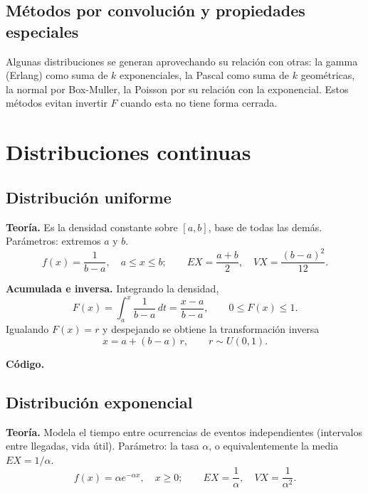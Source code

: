 \documentclass[11pt]{article}
\begin{document}
\subsection{M\'etodos por convoluci\'on y propiedades especiales}

Algunas distribuciones se generan aprovechando su relaci\'on con otras: la
gamma (Erlang) como suma de $k$ exponenciales, la Pascal como suma de $k$
geom\'etricas, la normal por Box-Muller, la Poisson por su relaci\'on con
la exponencial. Estos m\'etodos evitan invertir $F$ cuando esta no tiene
forma cerrada.

\section{Distribuciones continuas}

\subsection{Distribuci\'on uniforme}

\textbf{Teor\'ia.} Es la densidad constante sobre $[a,b]$, base de todas las
dem\'as. Par\'ametros: extremos $a$ y $b$.
\begin{equation}
f(x) = \frac{1}{b-a}, \quad a \le x \le b; \qquad
EX = \frac{a+b}{2}, \quad VX = \frac{(b-a)^2}{12}.
\end{equation}

\textbf{Acumulada e inversa.} Integrando la densidad,
\begin{equation}
F(x) = \int_a^x \frac{1}{b-a}\,dt = \frac{x-a}{b-a},
\qquad 0 \le F(x) \le 1.
\end{equation}
Igualando $F(x) = r$ y despejando se obtiene la transformaci\'on inversa
\begin{equation}
x = a + (b-a)\,r, \qquad r \sim U(0,1).
\end{equation}

\textbf{C\'odigo.}


\subsection{Distribuci\'on exponencial}

\textbf{Teor\'ia.} Modela el tiempo entre ocurrencias de eventos
independientes (intervalos entre llegadas, vida \'util). Par\'ametro: la
tasa $\alpha$, o equivalentemente la media $EX = 1/\alpha$.
\begin{equation}
f(x) = \alpha e^{-\alpha x}, \quad x \ge 0; \qquad
EX = \frac{1}{\alpha}, \quad VX = \frac{1}{\alpha^2}.
\end{equation}
\end{document}

